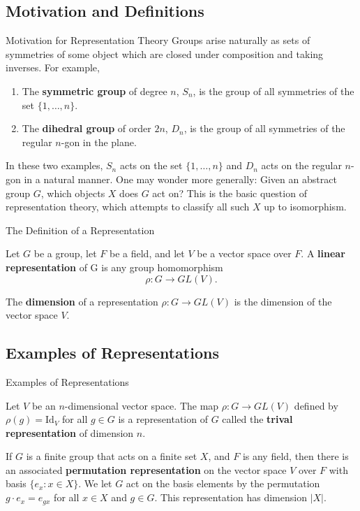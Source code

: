 \subsection{Motivation and Definitions}
\begin{frame}{Motivation for Representation Theory}
Groups arise naturally as sets of symmetries of some object which are closed under composition and taking inverses.  For example, 
\begin{enumerate}
\item The \textbf{symmetric group} of degree $n$, $S_n$, is the group of all symmetries of the set $\{ 1, \ldots, n \}$.
\item The \textbf{dihedral group} of order $2n$, $D_{n}$, is the group of all symmetries of the regular $n$-gon in the plane.
\end{enumerate}
In these two examples, $S_n$  acts on the set $\{ 1, \ldots, n \}$ and $D_{n}$ acts on the regular $n$-gon in a natural manner. One may wonder more generally:  Given an abstract group $G$, which objects $X$ does $G$ act on?
This is the basic question of representation theory, which attempts to classify all such $X$ up to isomorphism.
\end{frame}


\begin{frame}{The Definition of a Representation}
\begin{definition}
Let $G$ be a group, let $F$ be a field, and let $V$ be a vector space over $F$.  A \textbf{linear representation} of G is any group homomorphism \[\rho\colon G \to GL(V).\]
\end{definition}

\begin{definition}
The \textbf{dimension} of a representation $\rho \colon G \to GL(V)$ is the dimension of the vector space $V$.  
\end{definition}
\end{frame}

\subsection{Examples of Representations}
\begin{frame}{Examples of Representations}
\begin{example}
Let $V$ be an $n$-dimensional vector space.  The map $\rho \colon G \to GL(V)$ defined by $\rho(g) = \text{Id}_V$ for all $g \in G$ is a representation of $G$ called the \textbf{trival representation} of dimension $n$. 
\end{example}

\begin{example} If $G$ is a finite group that acts on a finite set $X$, and $F$ is any field, then there is an associated \textbf{permutation representation}  on the vector space $V$ over $F$ with basis $\{e_x \colon x \in X\}$.  We let $G$ act on the basis elements by the permutation $g \cdot e_x = e_{gx}$ for all $x \in X$ and $g \in G$. This representation has dimension $|X|$.  \end{example}
\end{frame}

